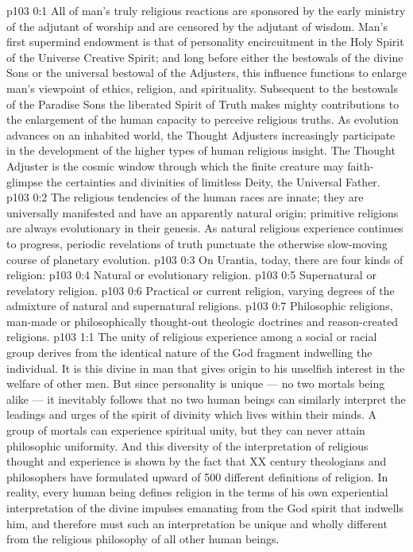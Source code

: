 \author{Melchizedek}
\vs p103 0:1 All of man’s truly religious reactions are sponsored by the early ministry of the adjutant of worship and are censored by the adjutant of wisdom. Man’s first supermind endowment is that of personality encircuitment in the Holy Spirit of the Universe Creative Spirit; and long before either the bestowals of the divine Sons or the universal bestowal of the Adjusters, this influence functions to enlarge man’s viewpoint of ethics, religion, and spirituality. Subsequent to the bestowals of the Paradise Sons the liberated Spirit of Truth makes mighty contributions to the enlargement of the human capacity to perceive religious truths. As evolution advances on an inhabited world, the Thought Adjusters increasingly participate in the development of the higher types of human religious insight. The Thought Adjuster is the cosmic window through which the finite creature may faith\hyp{}glimpse the certainties and divinities of limitless Deity, the Universal Father.
\vs p103 0:2 The religious tendencies of the human races are innate; they are universally manifested and have an apparently natural origin; primitive religions are always evolutionary in their genesis. As natural religious experience continues to progress, periodic revelations of truth punctuate the otherwise slow\hyp{}moving course of planetary evolution.
\vs p103 0:3 \pc On Urantia, today, there are four kinds of religion:
\vs p103 0:4 \bibnobreakspace Natural or evolutionary religion.
\vs p103 0:5 \bibnobreakspace Supernatural or revelatory religion.
\vs p103 0:6 \bibnobreakspace Practical or current religion, varying degrees of the admixture of natural and supernatural religions.
\vs p103 0:7 \bibnobreakspace Philosophic religions, man\hyp{}made or philosophically thought\hyp{}out theologic doctrines and reason\hyp{}created religions.
\vs p103 1:1 The unity of religious experience among a social or racial group derives from the identical nature of the God fragment indwelling the individual. It is this divine in man that gives origin to his unselfish interest in the welfare of other men. But since personality is unique --- no two mortals being alike --- it inevitably follows that no two human beings can similarly interpret the leadings and urges of the spirit of divinity which lives within their minds. A group of mortals can experience spiritual unity, but they can never attain philosophic uniformity. And this diversity of the interpretation of religious thought and experience is shown by the fact that XX century theologians and philosophers have formulated upward of 500 different definitions of religion. In reality, every human being defines religion in the terms of his own experiential interpretation of the divine impulses emanating from the God spirit that indwells him, and therefore must such an interpretation be unique and wholly different from the religious philosophy of all other human beings.
